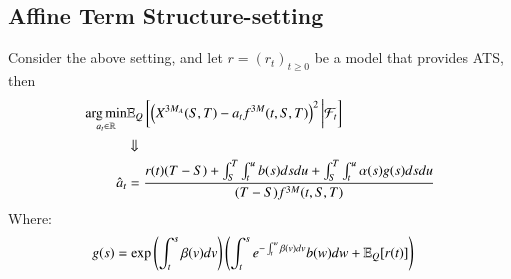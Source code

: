 \newpage 

\subsection{Affine Term Structure-setting}

\begin{proposition}
Consider the above setting, and let $r = (r_{t})_{t\geq 0}$ be a model that provides ATS, then 
\begin{align*}
\operatorname*{arg\,min}\limits_{a_{t} \in \mathbb{R}}&\mathbb{E}_{Q}\left[
\left(
X^{3M_{A}}(S,T)- a_{t}f^{3M}(t,S,T)
\right)^{2}
\bigg{|}\mathcal{F}_{t}
\right] \\
&\Downarrow \\
\hat{a}_{t} &= \frac{
r(t)(T-S)
+ \int_{S}^{T}\int_{t}^{u}b(s)dsdu 
+ \int_{S}^{T}\int_{t}^{u}\alpha(s)g(s)dsdu
}{
(T-S)f^{3M}(t,S,T)
}
\end{align*}
Where:
\begin{align*}
g(s) &= \exp\left(
\int_{t}^{s}\beta(v)dv
\right)
\left(
\int_{t}^{s}e^{-\int_{t}^{w}\beta(v)dv}b(w)dw + \mathbb{E}_{Q}[r(t)]
\right) 
\end{align*}
\end{proposition}

